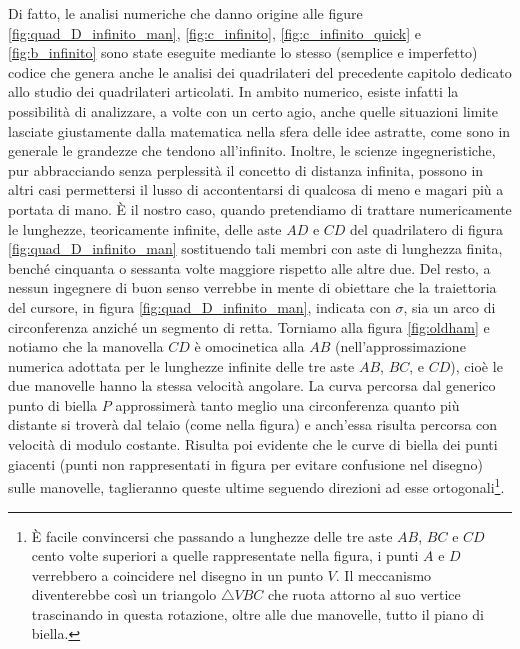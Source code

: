 Di fatto,
le analisi numeriche che danno origine alle figure \ref{fig:quad_D_infinito_man},
\ref{fig:c_infinito}, \ref{fig:c_infinito_quick} e \ref{fig:b_infinito} sono
state eseguite mediante lo  stesso (semplice e imperfetto) codice che genera
anche le analisi dei quadrilateri del precedente capitolo dedicato
allo studio dei quadrilateri articolati. In ambito numerico,
esiste infatti la possibilit\`a di analizzare, a volte con un certo agio,
anche quelle situazioni limite lasciate
giustamente dalla matematica nella sfera delle idee astratte, come sono in
generale le grandezze che tendono all'infinito.
Inoltre, le scienze ingegneristiche, pur abbracciando senza perplessit\`a il
concetto di distanza infinita, possono in altri casi permettersi il 
lusso  di accontentarsi di qualcosa di meno e magari pi\`u a portata di mano.
\`E il nostro caso, quando pretendiamo di trattare numericamente
le lunghezze, teoricamente infinite, delle aste $AD$ e $CD$ del quadrilatero
di figura \ref{fig:quad_D_infinito_man} sostituendo tali membri con
aste di lunghezza finita, bench\'e 
cinquanta o sessanta volte maggiore rispetto alle altre due.
Del resto, a nessun ingegnere di buon senso verrebbe in mente di obiettare
che la traiettoria del cursore, in figura \ref{fig:quad_D_infinito_man},
indicata con $\sigma$,
sia un arco di circonferenza anzich\'e un segmento di retta.
Torniamo alla figura \ref{fig:oldham} e  notiamo che la manovella $CD$
\`e omocinetica alla $AB$ (nell'approssimazione numerica adottata per le
lunghezze infinite delle tre aste $AB$, $BC$, e $CD$), cio\`e le due manovelle
hanno la stessa velocit\`a angolare.
La curva percorsa dal generico punto di biella $P$ approssimer\`a
tanto meglio una circonferenza quanto pi\`u distante si trover\`a dal telaio
(come nella figura) e anch'essa risulta percorsa con velocit\`a di modulo
costante. Risulta poi evidente che le curve di biella dei punti giacenti
(punti non rappresentati in figura per evitare confusione nel disegno)
 sulle manovelle, taglieranno queste ultime
seguendo direzioni ad esse ortogonali\footnote{\`E facile convincersi
che passando a lunghezze delle tre aste $AB$, $BC$ e $CD$ cento volte
superiori a quelle rappresentate  nella figura, i punti $A$ e $D$ verrebbero
a coincidere nel disegno in un punto $V$. Il meccanismo diventerebbe cos\`i
un triangolo $\triangle VBC$ che ruota attorno al suo vertice trascinando
in questa rotazione, oltre alle due manovelle, tutto il piano di biella.}.

